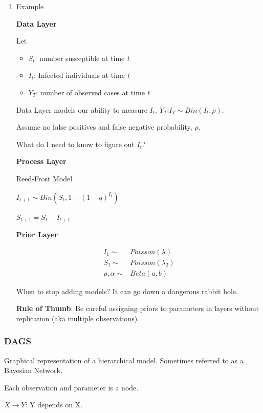\documentclass[11pt]{article}
\begin{document}
\begin{enumerate}
\item Example
\label{sec:org77d9ef0}

\textbf{Data Layer}

Let
\begin{itemize}
\item \(S_t\): number susceptible at time \emph{t}
\item \(I_t\): Infected individuals at time \emph{t}
\item \(Y_T\): number of observed cases at time \emph{t}
\end{itemize}

Data Layer models our ability to measure \(I_t\). \(Y_T | I_T \sim Bin(I_t, \rho)\).

Assume no false positives and false negative probability, \(\rho\).

What do I need to know to figure out \(I_t\)?

\textbf{Process Layer}

Reed-Frost Model

\(I_{t + 1} \sim Bin (S_t, 1 - (1 - q)^{I_t})\)

\(S_{t + 1} = S_t - I_{t + 1}\)

\textbf{Prior Layer}

\begin{equation}
\begin{split}
I_1 \sim & Poisson(\lambda)\\
S_1 \sim & Poisson(\lambda_2)\\
\rho, \alpha \sim & Beta(a, b)
\end{split}
\end{equation}


When to stop adding models? It can go down a dangerous rabbit hole.

\textbf{Rule of Thumb}: Be careful assigning priors to parameters in layers without
 replication (aka multiple observations).
\end{enumerate}

\subsubsection{DAGS}
\label{sec:org8356f56}
Graphical representation of a hierarchical model. Sometimes referred to as a
Bayesian Network.

Each observation and parameter is a node.

\(X \to Y\): Y depends on X.
\end{document}
